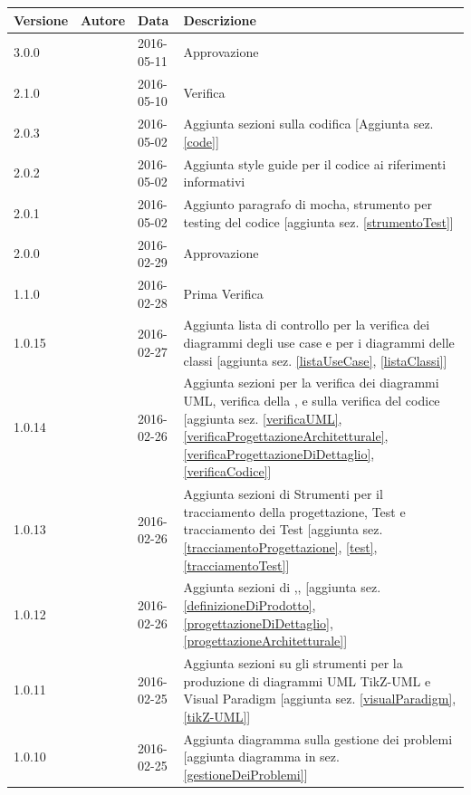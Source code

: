 \documentclass[12pt,a4paper]{article}
\begin{document}
\begin{center}
	\begin{longtable}[H]{p{} p{} p{} p{}}
		\toprule
		\textbf{Versione}	&	\textbf{Autore}	&	\textbf{Data}	&	\textbf{Descrizione}\\*
		\midrule
		\midrule
		3.0.0 & \AVE{} & 2016-05-11 & Approvazione\\*
		\midrule
		2.1.0 & \WS{} & 2016-05-10 & Verifica\\*
		\midrule
		2.0.3 & \IB{} & 2016-05-02 & Aggiunta sezioni sulla codifica [Aggiunta sez. \ref{code}]\\*
		\midrule
		2.0.2 & \IB{} & 2016-05-02 & Aggiunta style guide per il codice ai riferimenti informativi\\*
		\midrule
		2.0.1 & \IB{} & 2016-05-02 & Aggiunto paragrafo di mocha, strumento per testing del codice [aggiunta sez. \ref{strumentoTest}]\\*
		\midrule
		2.0.0 & \AB{} & 2016-02-29 & Approvazione\\*
		\midrule
		1.1.0 & \AVI{} & 2016-02-28 & Prima Verifica\\*
		\midrule
		1.0.15 & \TP{} & 2016-02-27 & Aggiunta lista di controllo per la verifica dei diagrammi degli use case e per i diagrammi delle classi [aggiunta sez. 
		\ref{listaUseCase},
		\ref{listaClassi}]\\*
		\midrule
		1.0.14 & \TP{} & 2016-02-26 & Aggiunta sezioni per la verifica dei diagrammi UML, verifica della \FPA{}, \FPD{} e sulla verifica del codice [aggiunta sez. 
		\ref{verificaUML},
		\ref{verificaProgettazioneArchitetturale},
		\ref{verificaProgettazioneDiDettaglio},
		\ref{verificaCodice}]\\*
		\midrule
		1.0.13 & \TP{} & 2016-02-26 & Aggiunta sezioni di Strumenti per il tracciamento della progettazione, Test e tracciamento dei Test [aggiunta sez. 
		\ref{tracciamentoProgettazione},
		\ref{test},
		\ref{tracciamentoTest}]\\*
		\midrule
		1.0.12 & \TP{} & 2016-02-26 & Aggiunta sezioni di \DP{},\FPD{},\FPA{} [aggiunta sez. \ref{definizioneDiProdotto},
		\ref{progettazioneDiDettaglio},
		\ref{progettazioneArchitetturale}]\\*
		\midrule
		1.0.11 & \TP{} & 2016-02-25 & Aggiunta sezioni su gli strumenti per la produzione di diagrammi UML TikZ-UML e Visual Paradigm [aggiunta sez. \ref{visualParadigm},\ref{tikZ-UML}]\\*
		\midrule
		1.0.10 & \TP{} & 2016-02-25 & Aggiunta diagramma sulla gestione dei problemi [aggiunta diagramma in sez. \ref{gestioneDeiProblemi}] \\*

\end{longtable}
\end{center}
\end{document}
